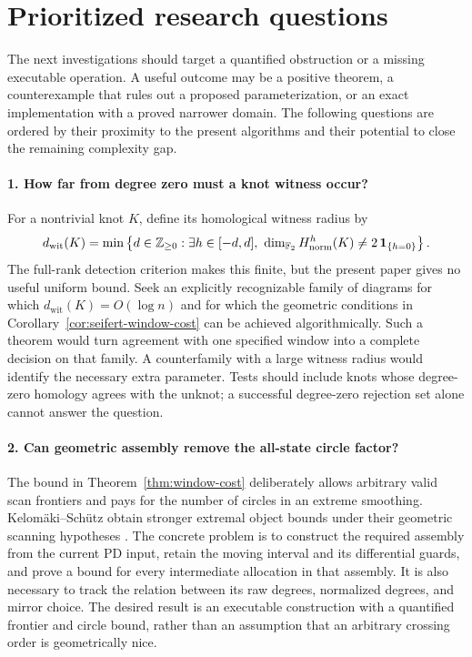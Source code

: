 \section{Prioritized research questions}
\label{sec:research-agenda}

The next investigations should target a quantified obstruction or a
missing executable operation.  A useful outcome may be a positive
theorem, a counterexample that rules out a proposed parameterization,
or an exact implementation with a proved narrower domain.  The following
questions are ordered by their proximity to the present algorithms and
their potential to close the remaining complexity gap.

\paragraph{1. How far from degree zero must a knot witness occur?}
For a nontrivial knot $K$, define its homological witness radius by
\[
 d_{\mathrm{wit}}(K)=
 \min\left\{d\in\mathbb Z_{\geq0}:
  \exists h\in[-d,d],\
  \dim_{\mathbb F_2}H_{\mathrm{norm}}^h(K)
       \ne2\,\mathbf1_{\{h=0\}}\right\}.
\]
The full-rank detection criterion makes this finite, but the present
paper gives no useful uniform bound.  Seek an explicitly recognizable
family of diagrams for which $d_{\mathrm{wit}}(K)=O(\log n)$ and for
which the geometric conditions in
Corollary~\ref{cor:seifert-window-cost} can be achieved algorithmically.
Such a theorem would turn agreement with one specified window into a
complete decision on that family.  A counterfamily with a large witness
radius would identify the necessary extra parameter.  Tests should
include knots whose degree-zero homology agrees with the unknot; a
successful degree-zero rejection set alone cannot answer the question.

\paragraph{2. Can geometric assembly remove the all-state circle factor?}
The bound in Theorem~\ref{thm:window-cost} deliberately allows arbitrary
valid scan frontiers and pays for the number of circles in an extreme
smoothing.  Kelom\"aki--Sch\"utz obtain stronger extremal object bounds
under their geometric scanning hypotheses \cite{kelomaki}.  The concrete
problem is to construct the required assembly from the current PD input,
retain the moving interval and its differential guards, and prove a
bound for every intermediate allocation in that assembly.  It is also
necessary to track the relation between its raw degrees, normalized
degrees, and mirror choice.  The desired result is an executable
construction with a quantified frontier and circle bound, rather than
an assumption that an arbitrary crossing order is geometrically nice.

